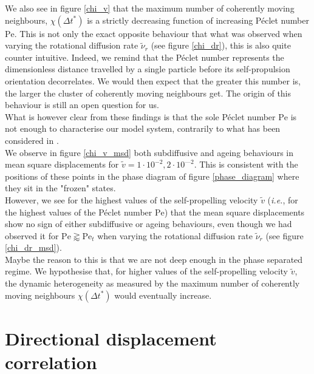 \documentclass[class=report, float=false, crop=false]{standalone}
\begin{document}
We also see in figure \ref{chi_v} that the maximum number of coherently moving neighbours, $\chi(\Delta t^*)$ is a strictly decreasing function of increasing P\'eclet number $\text{Pe}$. This is not only the exact opposite behaviour that what was observed when varying the rotational diffusion rate $\tilde{\nu}_r$ (see figure \ref{chi_dr}), this is also quite counter intuitive. Indeed, we remind that the P\'eclet number represents the dimensionless distance travelled by a single particle before its self-propulsion orientation decorrelates. We would then expect that the greater this number is, the larger the cluster of coherently moving neighbours get. The origin of this behaviour is still an open question for us.\\

What is however clear from these findings is that the sole P\'eclet number $\text{Pe}$ is not enough to characterise our model system, contrarily to what has been considered in \cite{wysocki2014cooperative}.\\

We observe in figure \ref{chi_v_msd} both subdiffusive and ageing behaviours in mean square displacements for $\tilde{v} = 1\cdot10^{-2}, 2\cdot10^{—2}$. This is consistent with the positions of these points in the phase diagram of figure \ref{phase_diagram} where they sit in the "frozen" states.\\

However, we see for the highest values of the self-propelling velocity $\tilde{v}$ (\textit{i.e.}, for the highest values of the P\'eclet number $\text{Pe}$) that the mean square displacements show no sign of either subdiffusive or ageing behaviours, even though we had observed it for $\text{Pe} \gtrapprox \text{Pe}_t$ when varying the rotational diffusion rate $\tilde{\nu}_r$ (see figure \ref{chi_dr_msd}).\\

Maybe the reason to this is that we are not deep enough in the phase separated regime. We hypothesise that, for higher values of the self-propelling velocity $\tilde{v}$, the dynamic heterogeneity as measured by the maximum number of coherently moving neighbours $\chi(\Delta t^*)$ would eventually increase.

\section{Directional displacement correlation}
\label{section:directional_displacement_correlation}
\end{document}
